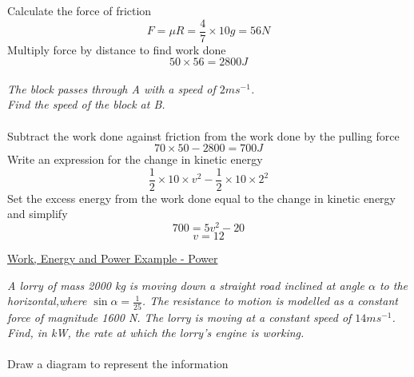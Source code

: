 \documentclass{article}[18pt]
\begin{document}
Calculate the force of friction
$$F=\mu R=\frac{4}{7}\times10g=56N$$
Multiply force by distance to find work done
$$50\times56=2800J$$
\\
\textit{The block passes through A with a speed of $2ms^{-1}$.\\
Find the speed of the block at B.}
\\
\\
Subtract the work done against friction from the work done by the pulling force
$$70\times50-2800=700J$$
Write an expression for the change in kinetic energy
$$\frac{1}{2}\times10\times v^2-\frac{1}{2}\times10\times2^2$$
Set the excess energy from the work done equal to the change in kinetic energy and simplify
$$700=5v^2-20$$
$$v=12$$
\newpage
\begin{center}
\underline{\huge Work, Energy and Power Example - Power}
\end{center}
\textit{A lorry of mass 2000 kg is moving down a straight road inclined at angle $\alpha$ to the horizontal,where $\sin\alpha=\frac{1}{25}$. The resistance to motion is modelled as a constant force of magnitude 1600 N. The lorry is moving at a constant speed of $14ms^{-1}$.\\
Find, in kW, the rate at which the lorry's engine is working.}
\\
\\
Draw a diagram to represent the information
\def\iangle{35} %
\end{document}
